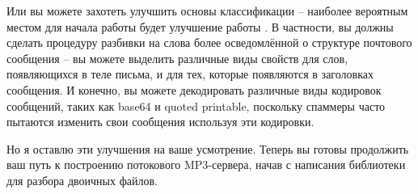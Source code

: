 Или вы можете захотеть улучшить основы классификации -- наиболее вероятным местом для
начала работы будет улучшение работы .  В частности, вы должны
сделать процедуру разбивки на слова более осведомлённой о структуре почтового сообщения --
вы можете выделить различные виды свойств для слов, появляющихся в теле письма, и для тех,
которые появляются в заголовках сообщения.  И конечно, вы можете декодировать различные
виды кодировок сообщений, таких как base64 и quoted printable, поскольку спаммеры часто
пытаются изменить свои сообщения используя эти кодировки.

Но я оставлю эти улучшения на ваше усмотрение.  Теперь вы готовы продолжить ваш путь к
построению потокового MP3-сервера, начав с написания библиотеки для разбора двоичных
файлов.

